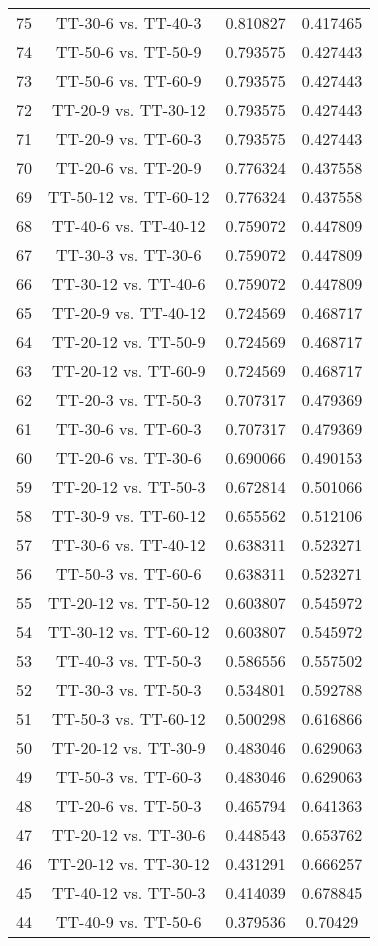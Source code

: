 \documentclass[a4paper,10pt]{article}
\begin{document}
\begin{landscape}
\begin{table}[!htp]
\begin{tabular}{cccc}
75&TT-30-6 vs. TT-40-3&0.810827&0.417465\\
74&TT-50-6 vs. TT-50-9&0.793575&0.427443\\
73&TT-50-6 vs. TT-60-9&0.793575&0.427443\\
72&TT-20-9 vs. TT-30-12&0.793575&0.427443\\
71&TT-20-9 vs. TT-60-3&0.793575&0.427443\\
70&TT-20-6 vs. TT-20-9&0.776324&0.437558\\
69&TT-50-12 vs. TT-60-12&0.776324&0.437558\\
68&TT-40-6 vs. TT-40-12&0.759072&0.447809\\
67&TT-30-3 vs. TT-30-6&0.759072&0.447809\\
66&TT-30-12 vs. TT-40-6&0.759072&0.447809\\
65&TT-20-9 vs. TT-40-12&0.724569&0.468717\\
64&TT-20-12 vs. TT-50-9&0.724569&0.468717\\
63&TT-20-12 vs. TT-60-9&0.724569&0.468717\\
62&TT-20-3 vs. TT-50-3&0.707317&0.479369\\
61&TT-30-6 vs. TT-60-3&0.707317&0.479369\\
60&TT-20-6 vs. TT-30-6&0.690066&0.490153\\
59&TT-20-12 vs. TT-50-3&0.672814&0.501066\\
58&TT-30-9 vs. TT-60-12&0.655562&0.512106\\
57&TT-30-6 vs. TT-40-12&0.638311&0.523271\\
56&TT-50-3 vs. TT-60-6&0.638311&0.523271\\
55&TT-20-12 vs. TT-50-12&0.603807&0.545972\\
54&TT-30-12 vs. TT-60-12&0.603807&0.545972\\
53&TT-40-3 vs. TT-50-3&0.586556&0.557502\\
52&TT-30-3 vs. TT-50-3&0.534801&0.592788\\
51&TT-50-3 vs. TT-60-12&0.500298&0.616866\\
50&TT-20-12 vs. TT-30-9&0.483046&0.629063\\
49&TT-50-3 vs. TT-60-3&0.483046&0.629063\\
48&TT-20-6 vs. TT-50-3&0.465794&0.641363\\
47&TT-20-12 vs. TT-30-6&0.448543&0.653762\\
46&TT-20-12 vs. TT-30-12&0.431291&0.666257\\
45&TT-40-12 vs. TT-50-3&0.414039&0.678845\\
44&TT-40-9 vs. TT-50-6&0.379536&0.70429\\

\end{tabular}
\end{table}
\end{landscape}
\end{document}
